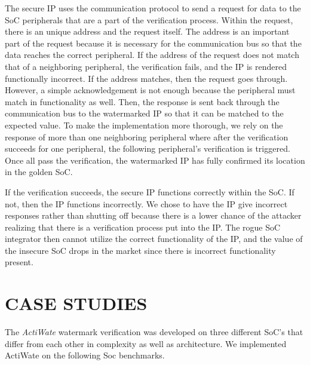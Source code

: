 \documentclass[onecolumn]{IEEEtran}
\begin{document}
The secure IP uses the communication protocol to send a request
for data to the SoC peripherals that are a part of the verification
process. Within the request, there is an unique address and the request
itself. The address is an important part of the request because it
is necessary for the communication bus so that the data reaches
the correct peripheral. If the address of the request does not match
that of a neighboring peripheral, the verification fails, and the IP
is rendered functionally incorrect. If the address matches, then the
request goes through. However, a simple acknowledgement is not
enough because the peripheral must match in functionality as well.
Then, the response is sent back through the communication bus to
the watermarked IP so that it can be matched to the expected value.
To make the implementation more thorough, we rely on the response
of more than one neighboring peripheral where after the verification
succeeds for one peripheral, the following peripheral’s verification is
triggered. Once all pass the verification, the watermarked IP has fully
confirmed its location in the golden SoC.

If the verification succeeds, the secure IP functions correctly within
the SoC. If not, then the IP functions incorrectly. We chose to have
the IP give incorrect responses rather than shutting off because there
is a lower chance of the attacker realizing that there is a verification
process put into the IP. The rogue SoC integrator then cannot utilize
the correct functionality of the IP, and the value of the insecure SoC
drops in the market since there is incorrect functionality present.

\section{CASE STUDIES}
\label{sec4}
The \textit{ActiWate} watermark verification was developed on three
different SoC’s that differ from each other in complexity as well
as architecture. We implemented ActiWate on the following Soc
benchmarks.
\end{document}
